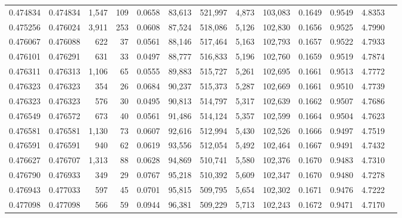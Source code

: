 \begin{tabular}{rrrrrrrrrrrrr}
0.474834 & 0.474834 & 1,547 &   109 &                                     0.0658 &  83,613 & 521,997 &   4,873 & 103,083 & 0.1649 & 0.9549 & 4.8353 \\
0.475256 & 0.476024 & 3,911 &   253 &                                     0.0608 &  87,524 & 518,086 &   5,126 & 102,830 & 0.1656 & 0.9525 & 4.7990 \\
0.476067 & 0.476088 &   622 &    37 &                                     0.0561 &  88,146 & 517,464 &   5,163 & 102,793 & 0.1657 & 0.9522 & 4.7933 \\
0.476101 & 0.476291 &   631 &    33 &                                     0.0497 &  88,777 & 516,833 &   5,196 & 102,760 & 0.1659 & 0.9519 & 4.7874 \\
0.476311 & 0.476313 & 1,106 &    65 &                                     0.0555 &  89,883 & 515,727 &   5,261 & 102,695 & 0.1661 & 0.9513 & 4.7772 \\
0.476323 & 0.476323 &   354 &    26 &                                     0.0684 &  90,237 & 515,373 &   5,287 & 102,669 & 0.1661 & 0.9510 & 4.7739 \\
0.476323 & 0.476323 &   576 &    30 &                                     0.0495 &  90,813 & 514,797 &   5,317 & 102,639 & 0.1662 & 0.9507 & 4.7686 \\
0.476549 & 0.476572 &   673 &    40 &                                     0.0561 &  91,486 & 514,124 &   5,357 & 102,599 & 0.1664 & 0.9504 & 4.7623 \\
0.476581 & 0.476581 & 1,130 &    73 &                                     0.0607 &  92,616 & 512,994 &   5,430 & 102,526 & 0.1666 & 0.9497 & 4.7519 \\
0.476591 & 0.476591 &   940 &    62 &                                     0.0619 &  93,556 & 512,054 &   5,492 & 102,464 & 0.1667 & 0.9491 & 4.7432 \\
0.476627 & 0.476707 & 1,313 &    88 &                                     0.0628 &  94,869 & 510,741 &   5,580 & 102,376 & 0.1670 & 0.9483 & 4.7310 \\
0.476790 & 0.476933 &   349 &    29 &                                     0.0767 &  95,218 & 510,392 &   5,609 & 102,347 & 0.1670 & 0.9480 & 4.7278 \\
0.476943 & 0.477033 &   597 &    45 &                                     0.0701 &  95,815 & 509,795 &   5,654 & 102,302 & 0.1671 & 0.9476 & 4.7222 \\
0.477098 & 0.477098 &   566 &    59 &                                     0.0944 &  96,381 & 509,229 &   5,713 & 102,243 & 0.1672 & 0.9471 & 4.7170 \\

\end{tabular}
